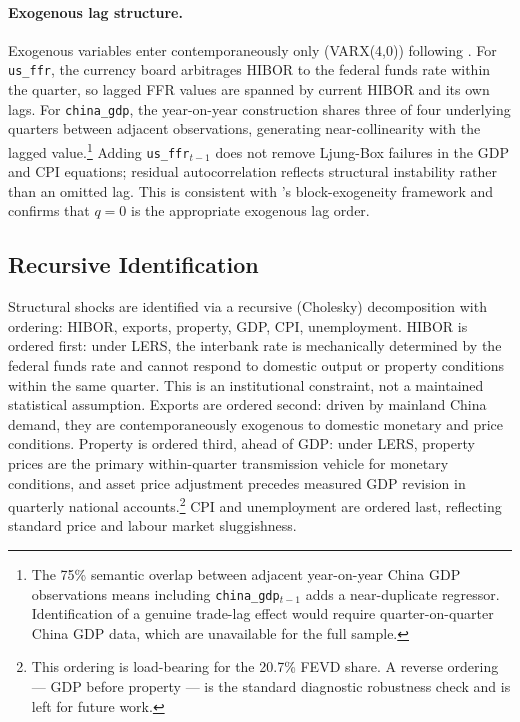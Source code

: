 \documentclass[12pt,a4paper]{article}
\begin{document}
\paragraph{Exogenous lag structure.}
Exogenous variables enter contemporaneously only (VARX(4,0)) following
\citet{CushmanZha1997}. For \texttt{us\_ffr}, the currency board arbitrages HIBOR
to the federal funds rate within the quarter, so lagged FFR values are spanned by
current HIBOR and its own lags. For \texttt{china\_gdp}, the year-on-year
construction shares three of four underlying quarters between adjacent
observations, generating near-collinearity with the lagged value.\footnote{The
75\% semantic overlap between adjacent year-on-year China GDP observations means
including \texttt{china\_gdp}$_{t-1}$ adds a near-duplicate regressor.
Identification of a genuine trade-lag effect would require quarter-on-quarter
China GDP data, which are unavailable for the full sample.} Adding
\texttt{us\_ffr}$_{t-1}$ does not remove Ljung-Box failures in the GDP and CPI
equations; residual autocorrelation reflects structural instability rather than
an omitted lag. This is consistent with \citet{CushmanZha1997}'s block-exogeneity
framework and confirms that $q = 0$ is the appropriate exogenous lag order.

\subsection{Recursive Identification}
\label{sec:identification}

Structural shocks are identified via a recursive (Cholesky) decomposition with
ordering: HIBOR, exports, property, GDP, CPI, unemployment. HIBOR is ordered
first: under LERS, the interbank rate is mechanically determined by the federal
funds rate and cannot respond to domestic output or property conditions within
the same quarter. This is an institutional constraint, not a maintained
statistical assumption. Exports are ordered second: driven by mainland China
demand, they are contemporaneously exogenous to domestic monetary and price
conditions. Property is ordered third, ahead of GDP: under LERS, property prices are
the primary within-quarter transmission vehicle for monetary conditions, and
asset price adjustment precedes measured GDP revision in quarterly national
accounts.\footnote{This ordering is load-bearing for the 20.7\% FEVD share.
A reverse ordering — GDP before property — is the standard diagnostic robustness
check and is left for future work.} CPI and unemployment
are ordered last, reflecting standard price and labour market sluggishness.
\end{document}
